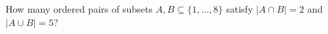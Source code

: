 How many ordered pairs of subsets $A,B\subseteq\{1,\ldots,8\}$ satisfy $|A\cap B|=2$ and $|A\cup B|=5$?
